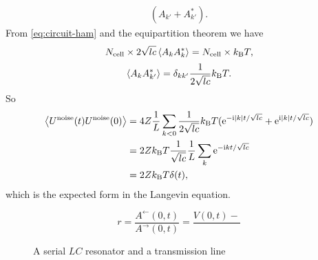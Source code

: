 \documentclass[hyperref, a4paper]{article}
\newcommand*{\ii}{\mathrm{i}}
\newcommand*{\ee}{\mathrm{e}}
\begin{document}
\begin{itemize}
\[\begin{aligned}
        (A_{k'} + A_{k'}^*).
    \end{aligned}
\]
From \eqref{eq:circuit-ham} and the equipartition theorem we have 
\[
    N_{\text{cell}} \times 2 \sqrt{lc} \expval{A_k A_{k}^*} = N_{\text{cell}} \times k_{\text{B}} T,
\]
\begin{equation}
    \expval{A_k A_{k'}^*} = \delta_{k k'} \frac{1}{2 \sqrt{lc}} k_{\text{B}} T.
\end{equation}
So 
\begin{equation}
    \begin{aligned}
        \expval{U^{\text{noise}}(t) U^{\text{noise}}(0)} &= 
        4 Z \frac{1}{L} \sum_{k < 0} \frac{1}{2 \sqrt{lc}} k_{\text{B}} T 
        (\ee^{- \ii \abs{k} t / \sqrt{lc} } + \ee^{\ii \abs{k} t / \sqrt{lc} }) \\
        &= 2 Z k_{\text{B}} T \frac{1}{\sqrt{lc}} \frac{1}{L} \sum_k \ee^{- \ii k t / \sqrt{lc}} \\
        &= 2 Z k_{\text{B}} T \delta(t),
    \end{aligned}
\end{equation}
which is the expected form in the Langevin equation.

\begin{equation}
    r = \frac{A^{\leftarrow}(0, t)}{A^{\rightarrow}(0, t)} = \frac{V(0, t) - }{}
\end{equation}

\end{itemize}

\begin{figure}
    \centering
    
    \caption{A serial $LC$ resonator and a transmission line}
    \label{fig:transmission-load}
\end{figure}
\end{document}
